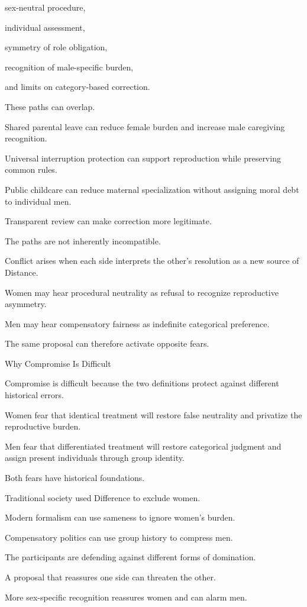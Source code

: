 sex-neutral procedure,

individual assessment,

symmetry of role obligation,

recognition of male-specific burden,

and limits on category-based correction.

These paths can overlap.

Shared parental leave can reduce female burden and increase male caregiving recognition.

Universal interruption protection can support reproduction while preserving common rules.

Public childcare can reduce maternal specialization without assigning moral debt to individual men.

Transparent review can make correction more legitimate.

The paths are not inherently incompatible.

Conflict arises when each side interprets the other’s resolution as a new source of Distance.

Women may hear procedural neutrality as refusal to recognize reproductive asymmetry.

Men may hear compensatory fairness as indefinite categorical preference.

The same proposal can therefore activate opposite fears.

Why Compromise Is Difficult

Compromise is difficult because the two definitions protect against different historical errors.

Women fear that identical treatment will restore false neutrality and privatize the reproductive burden.

Men fear that differentiated treatment will restore categorical judgment and assign present individuals through group identity.

Both fears have historical foundations.

Traditional society used Difference to exclude women.

Modern formalism can use sameness to ignore women’s burden.

Compensatory politics can use group history to compress men.

The participants are defending against different forms of domination.

A proposal that reassures one side can threaten the other.

More sex-specific recognition reassures women and can alarm men.

